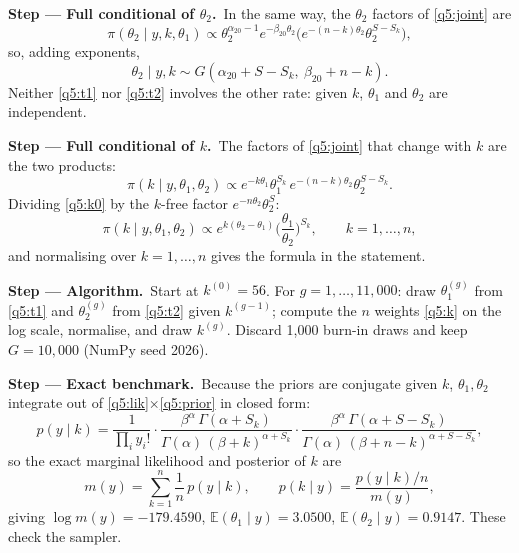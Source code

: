 \documentclass[11pt,a4paper]{article}
\numberwithin{equation}{questao}   %
\newcommand{\passo}[2]{\par\smallskip\noindent\textbf{Step --- #1.}~#2}
\newcommand{\E}{\mathbb{E}}
\begin{document}
\begin{sol}
\passo{Full conditional of $\theta_2$}{In the same way, the $\theta_2$ factors of \eqref{q5:joint}
are}
\[
\pi(\theta_2\mid y,k,\theta_1)\propto\theta_2^{\alpha_{20}-1}e^{-\beta_{20}\theta_2}\big(e^{-(n-k)\theta_2}\theta_2^{S-S_k}\big),
\]
so, adding exponents,
\begin{equation}\label{q5:t2}
\theta_2\mid y,k\sim G(\alpha_{20}+S-S_k,\ \beta_{20}+n-k).
\end{equation}
Neither \eqref{q5:t1} nor \eqref{q5:t2} involves the other rate: given $k$, $\theta_1$ and $\theta_2$
are independent.

\passo{Full conditional of $k$}{The factors of \eqref{q5:joint} that change with $k$ are the two
products:}
\begin{equation}\label{q5:k0}
\pi(k\mid y,\theta_1,\theta_2)\propto e^{-k\theta_1}\theta_1^{S_k}\,e^{-(n-k)\theta_2}\theta_2^{S-S_k}.
\end{equation}
Dividing \eqref{q5:k0} by the $k$-free factor $e^{-n\theta_2}\theta_2^{S}$:
\begin{equation}\label{q5:k}
\pi(k\mid y,\theta_1,\theta_2)\propto e^{k(\theta_2-\theta_1)}\Big(\frac{\theta_1}{\theta_2}\Big)^{S_k},
\qquad k=1,\dots,n,
\end{equation}
and normalising over $k=1,\dots,n$ gives the formula in the statement.

\passo{Algorithm}{Start at $k^{(0)}=56$. For $g=1,\dots,11{,}000$: draw $\theta_1^{(g)}$ from
\eqref{q5:t1} and $\theta_2^{(g)}$ from \eqref{q5:t2} given $k^{(g-1)}$; compute the $n$ weights
\eqref{q5:k} on the log scale, normalise, and draw $k^{(g)}$. Discard 1{,}000 burn-in draws and keep
$G=10{,}000$ (NumPy seed 2026).}

\passo{Exact benchmark}{Because the priors are conjugate given $k$, $\theta_1,\theta_2$ integrate out
of \eqref{q5:lik}$\times$\eqref{q5:prior} in closed form:}
\begin{equation}\label{q5:pyk}
p(y\mid k)=\frac{1}{\prod_iy_i!}\cdot\frac{\beta^\alpha\,\Gamma(\alpha+S_k)}{\Gamma(\alpha)\,(\beta+k)^{\alpha+S_k}}
\cdot\frac{\beta^\alpha\,\Gamma(\alpha+S-S_k)}{\Gamma(\alpha)\,(\beta+n-k)^{\alpha+S-S_k}} ,
\end{equation}
so the exact marginal likelihood and posterior of $k$ are
\begin{equation}\label{q5:exact}
m(y)=\sum_{k=1}^n\frac1n\,p(y\mid k),\qquad p(k\mid y)=\frac{p(y\mid k)/n}{m(y)},
\end{equation}
giving $\log m(y)=-179.4590$, $\E(\theta_1\mid y)=3.0500$, $\E(\theta_2\mid y)=0.9147$. These check the
sampler.


\end{sol}
\end{document}
